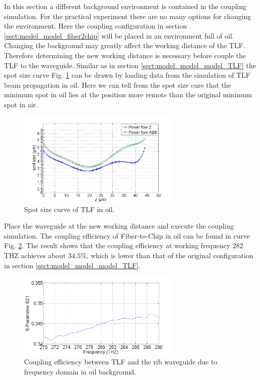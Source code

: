 In this section a different background environment is contained in the coupling simulation. For the practical experiment there are no many options for changing the environment. Here the coupling configuration in section \ref{sect:model_model_fiber2chip} will be placed in an environment full of oil. Changing the background may greatly affect the working distance of the  TLF. Therefore determining the new working distance is necessary before couple the TLF to the waveguide.  Similar as in section \ref{sect:model_model_model_TLF} the spot size curve Fig. \ref{fig:oil_spot_curve} can be drawn by loading data from the simulation of TLF beam propagation in oil. Here we can tell from the spot size cure that the minimum spot in oil lies at the position more remote than the original minimum spot in air.    
\begin{figure}[!ht]
\centering
\includegraphics[width=0.7\textwidth]{bilder/spot_curve_oil}
\caption{Spot size curve of TLF in oil.}
\label{fig:oil_spot_curve}
\end{figure}
Place the waveguide at the new working distance and execute the coupling simulation. The coupling efficiency of Fiber-to-Chip in oil can be found in curve Fig. \ref{fig:oil_coupling_curve}. The result shows that the coupling efficiency at working frequency $282$THZ achieves about $34.5\%$, which is lower than that of the original configuration in section \ref{sect:model_model_model_TLF}.
\begin{figure}[!ht]
\centering
\includegraphics[width=0.7\textwidth]{bilder/s21_oil_curve}
\caption{Coupling efficiency between TLF and the rib waveguide due to frequency domain in oil background.}
\label{fig:oil_coupling_curve}
\end{figure}
